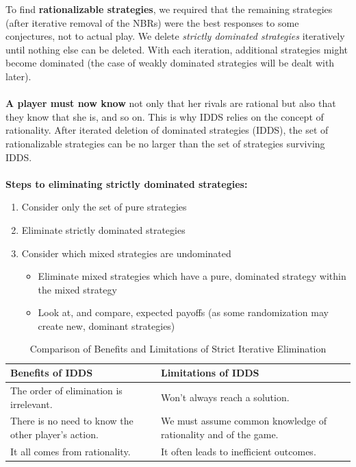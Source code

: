 \documentclass{article}
\begin{document}
To find \textbf{rationalizable strategies}, we required that the remaining strategies (after iterative removal of the NBRs) were the best responses to some conjectures, not to actual play. We delete \textit{strictly dominated strategies} iteratively until nothing else can be deleted. With each iteration, additional strategies might become dominated (the case of weakly dominated strategies will be dealt with later). \\
\\
\noindent \textbf{A player must now know} not only that her rivals are rational but also that they know that she is, and so on. This is why IDDS relies on the concept of rationality. After iterated deletion of dominated strategies (IDDS), the set of rationalizable strategies can be no larger than the set of strategies surviving IDDS. 
\\
\\
\noindent \textbf{Steps to eliminating strictly dominated strategies: }
\begin{enumerate}
    \item Consider only the set of pure strategies
    \item Eliminate strictly dominated strategies 
    \item Consider which mixed strategies are undominated
    \begin{itemize}
        \item Eliminate mixed strategies which have a pure, dominated strategy within the mixed strategy
        \item Look at, and compare, expected payoffs (as some randomization may create new, dominant strategies)
    \end{itemize}
\end{enumerate}

\begin{table}[h]
    \centering
    \renewcommand{\arraystretch}{1.3}
    \begin{tabular}{|p{7cm}|p{7cm}|}
        \hline
        \textbf{Benefits of IDDS} & \textbf{Limitations of IDDS} \\
        \hline
        The order of elimination is irrelevant. & Won’t always reach a solution. \\
        There is no need to know the other player’s action. & We must assume common knowledge of rationality and of the game. \\
        It all comes from rationality. & It often leads to inefficient outcomes. \\
        \hline
    \end{tabular}
    \caption{Comparison of Benefits and Limitations of Strict Iterative Elimination}
    \label{table:elim_benefits_vs_limitations}
\end{table}
\end{document}
